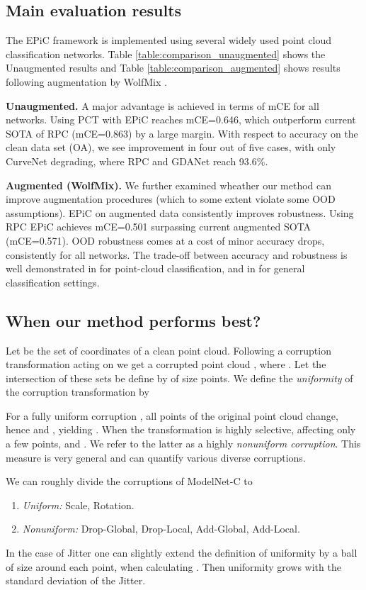 \documentclass[10pt,twocolumn]{article}
\begin{document}
\subsection{Main evaluation results}
The EPiC framework is implemented using several widely used point cloud classification networks.
Table \ref{table:comparison_unaugmented} shows the  Unaugmented results and Table \ref{table:comparison_augmented} shows results following augmentation by WolfMix \cite{pointwolf, rsmix}.

\textbf{Unaugmented.} A major advantage is achieved in terms of mCE for all networks. Using PCT\cite{pct} with EPiC reaches mCE=0.646, which outperform current SOTA of RPC\cite{modelnetc} (mCE=0.863) by a large margin. With respect to accuracy on the clean data set (OA), we see improvement in four out of five cases, with only CurveNet\cite{curvenet} degrading, where RPC\cite{modelnetc} and GDANet\cite{gdanet} reach 93.6\%. 


\textbf{Augmented (WolfMix).} We further examined wheather our method can improve augmentation procedures (which to some extent violate some OOD assumptions). EPiC on augmented data consistently improves robustness. Using RPC \cite{modelnetc} EPiC achieves mCE=0.501 surpassing current augmented SOTA (mCE=0.571). OOD robustness comes at a cost of minor accuracy drops, consistently for all networks. The trade-off between accuracy and robustness is well demonstrated in \cite{modelnetc} for point-cloud classification, and in \cite{robustness} for general classification settings.

\subsection{When our method performs best?} 


Let  be the set of coordinates of a clean point cloud. Following a corruption transformation  acting on  we get a corrupted point cloud , where . Let the intersection of these sets be define by  of size  points. We define the \emph{uniformity} of the corruption transformation by

For a fully uniform corruption , all points of the original point cloud change, hence  and , yielding . When the transformation is highly selective, affecting only a few points,  and  . We refer to the latter as a highly \emph{nonuniform corruption}. This measure is very general and can quantify various diverse corruptions. 

We can roughly divide the corruptions of ModelNet-C 
to \begin{enumerate}
    \item \emph{Uniform:} Scale, Rotation.
    \item \emph{Nonuniform:}  Drop-Global, Drop-Local, Add-Global, Add-Local.
\end{enumerate}
In the case of Jitter one can slightly extend the definition of uniformity by a ball of size  around each point, when calculating . Then uniformity grows with the standard deviation of the Jitter. 
\end{document}
